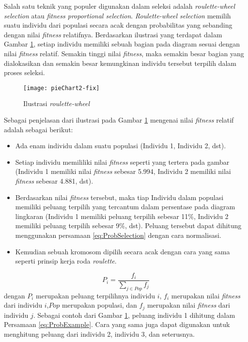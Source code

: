 Salah satu teknik yang populer digunakan dalam seleksi adalah \textit{roulette-wheel selection} atau \textit{fitness proportional selection}. \textit{Roulette-wheel selection} memilih suatu individu dari populasi secara acak dengan probabilitas yang sebanding dengan nilai \textit{fitness} relatifnya. Berdasarkan ilustrasi yang terdapat dalam Gambar \ref{fig:pieChart}, setiap individu memiliki sebuah bagian pada diagram sesuai dengan nilai \textit{fitness} relatif. Semakin tinggi nilai \textit{fitness}, maka semakin besar bagian yang dialokasikan dan semakin besar kemungkinan individu tersebut terpilih dalam proses seleksi.

\begin{figure}[H]
	\begin{center}
		\texttt{[image: pieChart2-fix]}
		\caption{Ilustrasi \textit{roulette-wheel}}
		\label{fig:pieChart}
	\end{center}
\end{figure}

Sebagai penjelasan dari ilustrasi pada Gambar \ref{fig:pieChart} mengenai nilai \textit{fitness} relatif adalah sebagai berikut:
\begin{itemize}
	\item Ada enam individu dalam suatu populasi (Individu 1, Individu 2, dst).
	\item Setiap individu memililiki nilai \textit{fitness} seperti yang tertera pada gambar (Individu 1 memiliki nilai \textit{fitness} sebesar 5.994, Individu 2 memiliki nilai \textit{fitness} sebesar 4.881, dst).
	\item Berdasarkan nilai \textit{fitness} tersebut, maka tiap Individu dalam populasi memiliki peluang terpilih yang tercantum dalam persentase pada diagram lingkaran (Individu 1 memiliki peluang terpilih sebesar 11\%, Individu 2 memiliki peluang terpilih sebesar 9\%, dst). Peluang tersebut dapat dihitung menggunakan persamaan \ref{eq:ProbSelection} dengan cara normalisasi.
	\item Kemudian sebuah kromosom dipilih secara acak dengan cara yang sama seperti prinsip kerja roda \textit{roulette}.
\end{itemize}

\begin{equation}
	\label{eq:ProbSelection}
	P_i=\frac{f_i}{\sum_{j \in Pop} f_j}
\end{equation}
dengan $P_i$ merupakan peluang terpilihnya individu $i$, $f_i$ merupakan nilai \textit{fitness} dari individu $i$,$Pop$ merupakan populasi, dan $f_j$ merupakan nilai \textit{fitness} dari individu $j$. Sebagai contoh dari Gambar \ref{fig:pieChart}, peluang individu 1 dihitung dalam Persamaan \ref{eq:ProbExample}. Cara yang sama juga dapat digunakan untuk menghitung peluang dari individu 2, individu 3, dan seterusnya.

